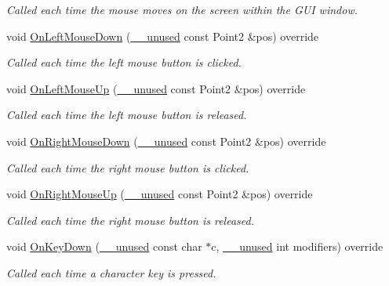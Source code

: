 \begin{DoxyCompactItemize}
\begin{DoxyCompactList}\small\item\em Called each time the mouse moves on the screen within the G\+UI window. \end{DoxyCompactList}\item 
void \hyperlink{classGraphicsArenaViewer_adf2fb01c3ca8b1774f031d68616b288c}{On\+Left\+Mouse\+Down} (\hyperlink{common_8h_a2e3484535ee610c8e19e9859563abe48}{\+\_\+\+\_\+unused} const Point2 \&pos) override
\begin{DoxyCompactList}\small\item\em Called each time the left mouse button is clicked. \end{DoxyCompactList}\item 
void \hyperlink{classGraphicsArenaViewer_abe4f11ab9bfb6055280ddf2b671d7032}{On\+Left\+Mouse\+Up} (\hyperlink{common_8h_a2e3484535ee610c8e19e9859563abe48}{\+\_\+\+\_\+unused} const Point2 \&pos) override
\begin{DoxyCompactList}\small\item\em Called each time the left mouse button is released. \end{DoxyCompactList}\item 
void \hyperlink{classGraphicsArenaViewer_a178a9f09ff241d4dc032b6d0998cc9c6}{On\+Right\+Mouse\+Down} (\hyperlink{common_8h_a2e3484535ee610c8e19e9859563abe48}{\+\_\+\+\_\+unused} const Point2 \&pos) override
\begin{DoxyCompactList}\small\item\em Called each time the right mouse button is clicked. \end{DoxyCompactList}\item 
void \hyperlink{classGraphicsArenaViewer_a5dfa16dca83575e253b6d3ea344f8746}{On\+Right\+Mouse\+Up} (\hyperlink{common_8h_a2e3484535ee610c8e19e9859563abe48}{\+\_\+\+\_\+unused} const Point2 \&pos) override
\begin{DoxyCompactList}\small\item\em Called each time the right mouse button is released. \end{DoxyCompactList}\item 
void \hyperlink{classGraphicsArenaViewer_ab0001d4a3ebde2b1f5b4cb7770824726}{On\+Key\+Down} (\hyperlink{common_8h_a2e3484535ee610c8e19e9859563abe48}{\+\_\+\+\_\+unused} const char $\ast$c, \hyperlink{common_8h_a2e3484535ee610c8e19e9859563abe48}{\+\_\+\+\_\+unused} int modifiers) override
\begin{DoxyCompactList}\small\item\em Called each time a character key is pressed. \end{DoxyCompactList}\item 

\end{DoxyCompactItemize}
